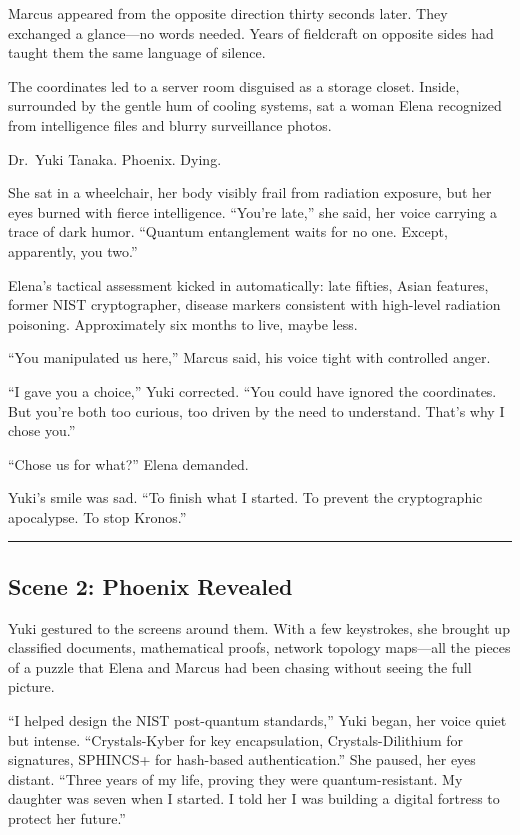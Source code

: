 Marcus appeared from the opposite direction thirty seconds later. They exchanged a glance---no words needed. Years of fieldcraft on opposite sides had taught them the same language of silence.

The coordinates led to a server room disguised as a storage closet. Inside, surrounded by the gentle hum of cooling systems, sat a woman Elena recognized from intelligence files and blurry surveillance photos.

Dr.~Yuki Tanaka. Phoenix. Dying.

She sat in a wheelchair, her body visibly frail from radiation exposure, but her eyes burned with fierce intelligence. ``You're late,'' she said, her voice carrying a trace of dark humor. ``Quantum entanglement waits for no one. Except, apparently, you two.''

Elena's tactical assessment kicked in automatically: late fifties, Asian features, former NIST cryptographer, disease markers consistent with high-level radiation poisoning. Approximately six months to live, maybe less.

``You manipulated us here,'' Marcus said, his voice tight with controlled anger.

``I gave you a choice,'' Yuki corrected. ``You could have ignored the coordinates. But you're both too curious, too driven by the need to understand. That's why I chose you.''

``Chose us for what?'' Elena demanded.

Yuki's smile was sad. ``To finish what I started. To prevent the cryptographic apocalypse. To stop Kronos.''

\begin{center}\rule{0.5\linewidth}{0.5pt}\end{center}

\hypertarget{scene-2-phoenix-revealed}{%
\subsection{Scene 2: Phoenix Revealed}\label{scene-2-phoenix-revealed}}

Yuki gestured to the screens around them. With a few keystrokes, she brought up classified documents, mathematical proofs, network topology maps---all the pieces of a puzzle that Elena and Marcus had been chasing without seeing the full picture.

``I helped design the NIST post-quantum standards,'' Yuki began, her voice quiet but intense. ``Crystals-Kyber for key encapsulation, Crystals-Dilithium for signatures, SPHINCS+ for hash-based authentication.'' She paused, her eyes distant. ``Three years of my life, proving they were quantum-resistant. My daughter was seven when I started. I told her I was building a digital fortress to protect her future.''

